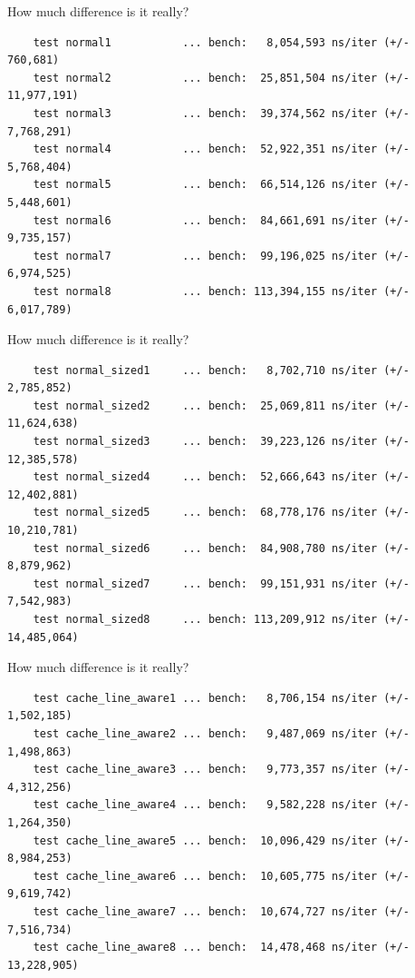 \documentclass[10pt,aspectratio=169]{beamer}
\begin{document}
\begin{frame}[fragile]{How much difference is it really?}
\begin{verbatim}
    test normal1           ... bench:   8,054,593 ns/iter (+/- 760,681)
    test normal2           ... bench:  25,851,504 ns/iter (+/- 11,977,191)
    test normal3           ... bench:  39,374,562 ns/iter (+/- 7,768,291)
    test normal4           ... bench:  52,922,351 ns/iter (+/- 5,768,404)
    test normal5           ... bench:  66,514,126 ns/iter (+/- 5,448,601)
    test normal6           ... bench:  84,661,691 ns/iter (+/- 9,735,157)
    test normal7           ... bench:  99,196,025 ns/iter (+/- 6,974,525)
    test normal8           ... bench: 113,394,155 ns/iter (+/- 6,017,789)
\end{verbatim}
\end{frame}


\begin{frame}[fragile]{How much difference is it really?}
\begin{verbatim}
    test normal_sized1     ... bench:   8,702,710 ns/iter (+/- 2,785,852)
    test normal_sized2     ... bench:  25,069,811 ns/iter (+/- 11,624,638)
    test normal_sized3     ... bench:  39,223,126 ns/iter (+/- 12,385,578)
    test normal_sized4     ... bench:  52,666,643 ns/iter (+/- 12,402,881)
    test normal_sized5     ... bench:  68,778,176 ns/iter (+/- 10,210,781)
    test normal_sized6     ... bench:  84,908,780 ns/iter (+/- 8,879,962)
    test normal_sized7     ... bench:  99,151,931 ns/iter (+/- 7,542,983)
    test normal_sized8     ... bench: 113,209,912 ns/iter (+/- 14,485,064)
\end{verbatim}
\end{frame}

\begin{frame}[fragile]{How much difference is it really?}
\begin{verbatim}
    test cache_line_aware1 ... bench:   8,706,154 ns/iter (+/- 1,502,185)
    test cache_line_aware2 ... bench:   9,487,069 ns/iter (+/- 1,498,863)
    test cache_line_aware3 ... bench:   9,773,357 ns/iter (+/- 4,312,256)
    test cache_line_aware4 ... bench:   9,582,228 ns/iter (+/- 1,264,350)
    test cache_line_aware5 ... bench:  10,096,429 ns/iter (+/- 8,984,253)
    test cache_line_aware6 ... bench:  10,605,775 ns/iter (+/- 9,619,742)
    test cache_line_aware7 ... bench:  10,674,727 ns/iter (+/- 7,516,734)
    test cache_line_aware8 ... bench:  14,478,468 ns/iter (+/- 13,228,905)
\end{verbatim}
\end{frame}
\end{document}

